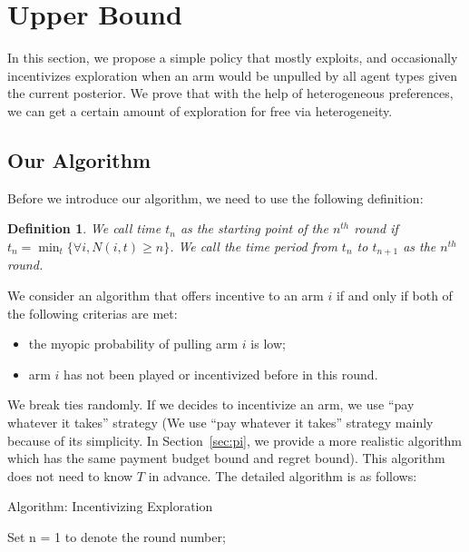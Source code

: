 \documentclass{article}
\newtheorem{definition}{Definition}[section]
\begin{document}
\section{Upper Bound}
\label{sec:ub}

In this section, we propose a simple policy that mostly exploits, and occasionally incentivizes exploration when an arm would be unpulled by all agent types given the current posterior. We prove that with the help of heterogeneous preferences, we can get a certain amount of exploration for free via heterogeneity. 

\subsection{Our Algorithm}
Before we introduce our algorithm, we need to use the following definition:

\begin{definition}
We call time $t_{n}$ as the starting point of the $n^{th}$ round if $t_{n}=\min_{t}\{\forall i, N(i,t)\geq n\}$. We call the time period from $t_{n}$ to $t_{n+1}$ as the $n^{th}$ round.
\end{definition}

We consider an algorithm that offers incentive to an arm $i$ if and only if both of the following criterias are met:
\begin{itemize}
\item the myopic probability of pulling arm $i$ is low; 
\item arm $i$ has not been played or incentivized before in this round.
\end{itemize}
We break ties randomly. If we decides to incentivize an arm, we use ``pay whatever it takes'' strategy (We use ``pay whatever it takes'' strategy mainly because of its simplicity. In Section~\ref{sec:pi}, we provide a more realistic algorithm which has the same payment budget bound and regret bound). This algorithm does not need to know $T$ in advance. The detailed algorithm is as follows:

\begin{algorithm}
\caption{Algorithm: Incentivizing Exploration}
\label{Alg1}
\begin{algorithmic}
\STATE Set n = 1 to denote the round number;
\ENDFOR

\end{algorithmic}
\end{algorithm}
\end{document}
